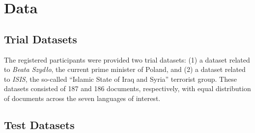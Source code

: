 \documentclass[11pt]{article}
\newcommand{\comment}[1]{}
\begin{document}

\comment{
16
Podlascy Czeczeni    Podlascy Czeczeni    PER    1
ISIS    ISIS    ORG    2
Rosji    Rosja    LOC    3
Polsce    Polska    LOC    4
Warszawie    Warszawa    LOC    5
Rosja    Rosja    LOC    3
Magazynu Kuriera Porannego \
      Magazyn Kuriera Porannego    ORG    6
}

\section{Data}
\label{sec:annotation}

\subsection{Trial Datasets}

The registered participants were provided two trial datasets: (1) a dataset related to {\em
  Beata Szydło}, the current prime minister of Poland, and (2) a dataset related to {\em
  ISIS}, the so-called ``Islamic State of Iraq and Syria'' terrorist group.  These datasets
consisted of 187 and 186 documents, respectively, with equal distribution of documents across
the seven languages of interest.

\subsection{Test Datasets}
\end{document}
